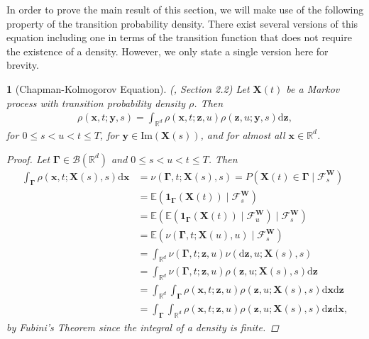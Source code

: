 \documentclass[english]{article}
\newcommand{\comment}[1]{\color{blue}#1\color{black}}
\numberwithin{equation}{section}
\numberwithin{figure}{section}
\theoremstyle{bolddescit}
\newtheorem{theorem}{\protect\theoremname}[section]
\theoremstyle{definition}
\theoremstyle{definition}
\theoremstyle{plain}
\theoremstyle{plain}
\theoremstyle{bolddesc}
\theoremstyle{plain}
\theoremstyle{remark}
\providecommand{\theoremname}{Theorem}
\begin{document}
In order to prove the main result of this section, we will make use of the following property of the transition probability density. There exist several versions of this equation including one in terms of the transition function that does not require the existence of a density. However, we only state a single version here for brevity.

\begin{theorem}[Chapman-Kolmogorov Equation]\label{thm:fp-chapman-kolmogorov}
  (\cite{pavliotis_stochastic_2014}, Section 2.2)
  Let $\mathbf{X}(t)$ be a Markov process with transition probability density $\rho$. Then
  \begin{align*}
    \rho(\mathbf{x}, t; \mathbf{y}, s) = \int_{\mathbb{R}^d} \rho(\mathbf{x}, t; \mathbf{z}, u) \rho(\mathbf{z}, u; \mathbf{y}, s) \mathrm{d}\mathbf{z},
  \end{align*}
  for $0 \le s < u < t \le T$, for $\mathbf{y} \in \mathrm{Im}(\mathbf{X}(s))$, and for almost all $\mathbf{x} \in \mathbb{R}^d$.

  \begin{proof}
    Let $\mathbf{\Gamma} \in \mathcal{B}(\mathbb{R}^d)$ and $0 \le s < u < t \le T$. Then
    \begin{align*}
      \int_\mathbf{\Gamma} \rho(\mathbf{x},t;\mathbf{X}(s),s) \mathrm{d}\mathbf{x}
      &= \nu(\mathbf{\Gamma},t;\mathbf{X}(s),s)
      = P(\mathbf{X}(t) \in \mathbf{\Gamma} \mid \mathcal{F}^\mathbf{W}_s)\\
      &= \mathbb{E}(\mathbf{1}_\mathbf{\Gamma}(\mathbf{X}(t)) \mid \mathcal{F}^\mathbf{W}_s)\\
      &= \mathbb{E}(\mathbb{E}(\mathbf{1}_\mathbf{\Gamma}(\mathbf{X}(t)) \mid \mathcal{F}^\mathbf{W}_u) \mid \mathcal{F}^\mathbf{W}_s) \tag{tower property}\\
      &= \mathbb{E}(\nu(\mathbf{\Gamma},t;\mathbf{X}(u),u) \mid \mathcal{F}^\mathbf{W}_s)\\
      &= \int_{\mathbb{R}^d} \nu(\mathbf{\Gamma},t;\mathbf{z},u) \nu(\mathrm{d}\mathbf{z},u;\mathbf{X}(s),s)\\
      &= \int_{\mathbb{R}^d} \nu(\mathbf{\Gamma},t;\mathbf{z},u) \rho(\mathbf{z},u;\mathbf{X}(s),s) \mathrm{d}\mathbf{z}\\
      &= \int_{\mathbb{R}^d} \int_\mathbf{\Gamma} \rho(\mathbf{x},t;\mathbf{z},u) \rho(\mathbf{z},u;\mathbf{X}(s),s) \mathrm{d}\mathbf{x} \mathrm{d}\mathbf{z}\\
      &= \int_\mathbf{\Gamma} \int_{\mathbb{R}^d} \rho(\mathbf{x},t;\mathbf{z},u) \rho(\mathbf{z},u;\mathbf{X}(s),s) \mathrm{d}\mathbf{z} \mathrm{d}\mathbf{x},
    \end{align*}
    by Fubini's Theorem since the integral of a density is finite.


\end{proof}
\end{theorem}
\end{document}
